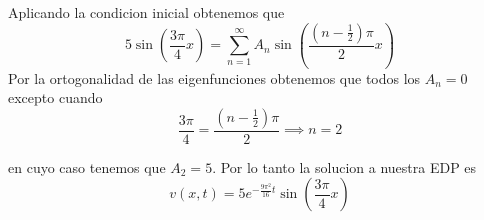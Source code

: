 \documentclass[../main.tex]{subfiles}
\begin{document}
\begin{solution}
  Aplicando la condicion inicial obtenemos que
  \begin{equation*}
    5 \sin (\frac{3\pi}{4}x) = \sum_{n = 1}^{\infty} A_{n} \sin(\frac{(n - \frac12)\pi}{2} x)
  \end{equation*}
  Por la ortogonalidad de las eigenfunciones obtenemos que todos los $A_{n} = 0$ excepto cuando
  \begin{equation*}
    \frac{3 \pi}{4} = \frac{(n - \frac{1}{2})\pi}{2} \implies n = 2
  \end{equation*}

  en cuyo caso tenemos que $A_{2} = 5$. Por lo tanto la solucion a nuestra EDP es
  \begin{equation*}
    v(x, t) = 5 e^{-\frac{9\pi^{2}}{16} t} \sin(\frac{3\pi}{4} x)
  \end{equation*}
\end{solution}
\end{document}
